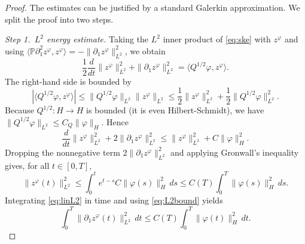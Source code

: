 \documentclass[11pt,a4paper,reqno]{amsart}
\theoremstyle{definition}
\begin{document}
\begin{proof}
  The estimates can be justified by a standard Galerkin approximation. We split the proof into two steps.

  \medskip
  \noindent\textit{Step 1.~$L^2$ energy estimate.}
  Taking the $L^2$ inner product of \eqref{eq:ske} with $z^\varphi$ and using
  $\langle\mathbb{P}\partial_1^2 z^\varphi, z^\varphi\rangle = -\|\partial_1 z^\varphi\|_{L^2}^2$,
  we obtain
  \begin{equation}\label{eq:linL2}
    \frac12\frac{d}{dt}\|z^\varphi\|_{L^2}^2 + \|\partial_1 z^\varphi\|_{L^2}^2
    = \langle Q^{1/2}\varphi, z^\varphi\rangle .
  \end{equation}
  The right-hand side is bounded by
  \[
    |\langle Q^{1/2}\varphi, z^\varphi\rangle|
    \le \|Q^{1/2}\varphi\|_{L^2} \|z^\varphi\|_{L^2}
    \le \frac12 \|z^\varphi\|_{L^2}^2 + \frac12 \|Q^{1/2}\varphi\|_{L^2}^2 .
  \]
  Because $Q^{1/2}:H\to H$ is bounded (it is even Hilbert-Schmidt), we have
  $\|Q^{1/2}\varphi\|_{L^2} \le C_Q \|\varphi\|_{H}$.  Hence
  \[
    \frac{d}{dt}\|z^\varphi\|_{L^2}^2 + 2\|\partial_1 z^\varphi\|_{L^2}^2
    \le \|z^\varphi\|_{L^2}^2 + C \|\varphi\|_{H}^2 .
  \]
  Dropping the nonnegative term $2\|\partial_1 z^\varphi\|_{L^2}^2$ and applying Gronwall's
  inequality gives, for all $t\in[0,T]$,
  \begin{equation}\label{eq:L2bound}
    \|z^\varphi(t)\|_{L^2}^2
    \le \int_0^t e^{t-s} C \|\varphi(s)\|_{H}^2\,ds
    \le C(T) \int_0^T \|\varphi(s)\|_{H}^2\,ds .
  \end{equation}
  Integrating \eqref{eq:linL2} in time and using \eqref{eq:L2bound} yields
  \begin{equation}\label{eq:L2diss}
    \int_0^T \|\partial_1 z^\varphi(t)\|_{L^2}^2\,dt
    \le C(T) \int_0^T \|\varphi(t)\|_{H}^2\,dt .
  \end{equation}


\end{proof}
\end{document}
